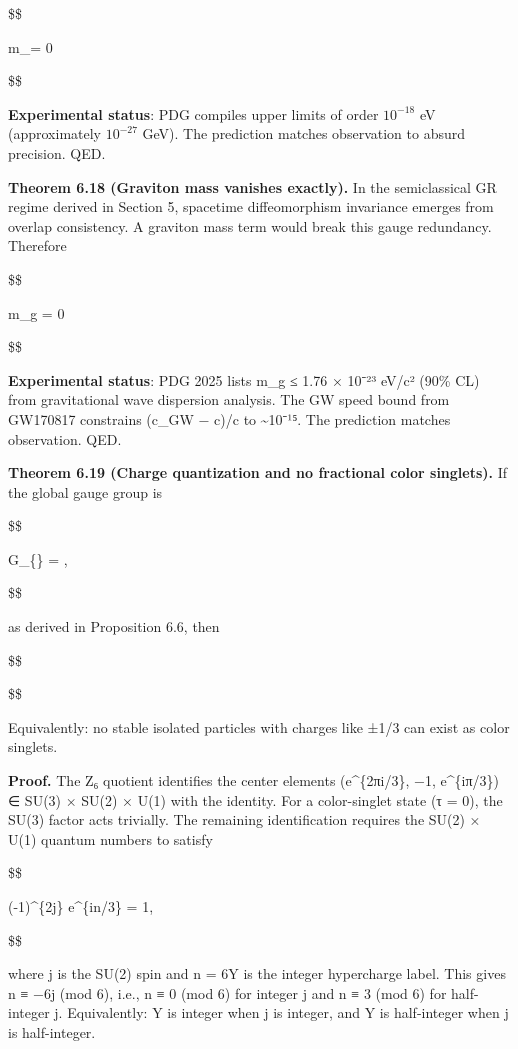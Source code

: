 \documentclass[11pt,a4paper]{article}
\theoremstyle{remark}
\begin{document}
\$\$

m\_\gamma = 0 

\$\$

\textbf{Experimental status}: PDG compiles upper limits of order \(10^{-18}\) eV
(approximately \(10^{-27}\) GeV). The prediction matches observation to absurd
precision. QED.

\textbf{Theorem 6.18 (Graviton mass vanishes exactly).} In the semiclassical GR
regime derived in Section 5, spacetime diffeomorphism invariance emerges
from overlap consistency. A graviton mass term would break this gauge
redundancy. Therefore

\$\$

m\_g = 0 

\$\$

\textbf{Experimental status}: PDG 2025 lists m\_g ≤ 1.76 × 10⁻²³
eV/c² (90\% CL) from gravitational wave dispersion analysis. The GW speed
bound from GW170817 constrains (c\_GW − c)/c to \textasciitilde10⁻¹⁵. The
prediction matches observation. QED.

\textbf{Theorem 6.19 (Charge quantization and no fractional color singlets).} If
the global gauge group is

\$\$

G\_\{\} = ,

\$\$

as derived in Proposition 6.6, then

\$\$


\$\$

Equivalently: no stable isolated particles with charges like ±1/3 can
exist as color singlets.

\textbf{Proof.} The Z₆ quotient identifies the center elements
(e\^{}\{2πi/3\}, −1, e\^{}\{iπ/3\}) ∈ SU(3) × SU(2) × U(1)
with the identity. For a color-singlet state (τ = 0), the SU(3) factor acts
trivially. The remaining identification requires the SU(2) × U(1)
quantum numbers to satisfy

\$\$

(-1)\^{}\{2j\} \cdot e\^{}\{i\pi n/3\} = 1,

\$\$

where j is the SU(2) spin and n = 6Y is the integer hypercharge label.
This gives n ≡ −6j (mod 6), i.e., n ≡ 0 (mod 6) for integer j and
n ≡ 3 (mod 6) for half-integer j. Equivalently: Y is integer when j is
integer, and Y is half-integer when j is half-integer.
\end{document}
